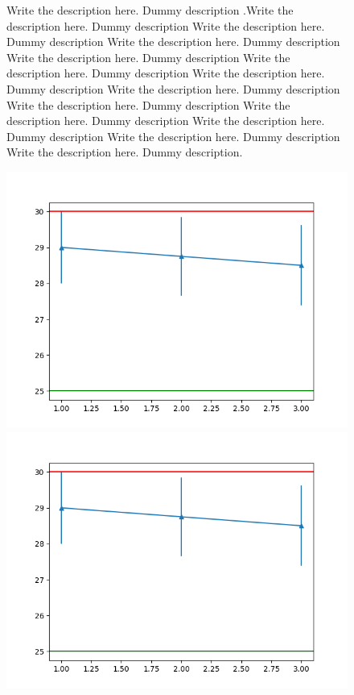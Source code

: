 \documentclass[9pt]{article}
\begin{document}
\begin{figure}
Write the description here. Dummy description .Write the description here. Dummy description Write the description here. Dummy description Write the description here. Dummy description Write the description here. Dummy description Write the description here. Dummy description Write the description here. Dummy description Write the description here. Dummy description Write the description here. Dummy description Write the description here. Dummy description Write the description here. Dummy description Write the description here. Dummy description Write the description here. Dummy description.
\begin{multicols}{2}
    \includegraphics[width=\linewidth,scale=0.5]{b}
    \includegraphics[width=\linewidth,scale=0.5]{b}

\end{multicols}
\end{figure}
\end{document}
